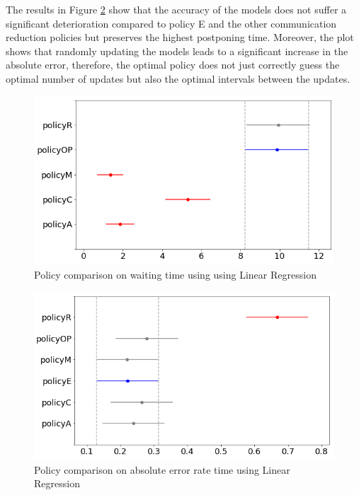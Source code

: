 \documentclass{mpaper}
\begin{document}
The results in Figure \ref{fig:lin_reg_pi3_error_plot_diff_means} show that the accuracy of the models does not suffer a significant deterioration compared to policy E and the other communication reduction policies but preserves the highest postponing time. Moreover, the plot shows that randomly updating the models leads to a significant increase in the absolute error, therefore, the optimal policy does not just correctly guess the optimal number of updates but also the optimal 
intervals between the updates. 
\begin{figure}[h]
    \centering
    \includegraphics[scale=0.35]{imgs/lin_reg_pi3_waiting_plot_diff_means.png}
    \caption{Policy comparison on waiting time using using Linear Regression}
    \label{fig:lin_reg_pi3_waiting_plot_diff_means}
\end{figure}
\begin{figure}[h]
    \centering
    \includegraphics[scale=0.35]{imgs/lin_reg_pi3_error_plot_diff_means.png}
    \caption{Policy comparison on absolute error rate time using Linear Regression}
    \label{fig:lin_reg_pi3_error_plot_diff_means}
\end{figure}
\end{document}
